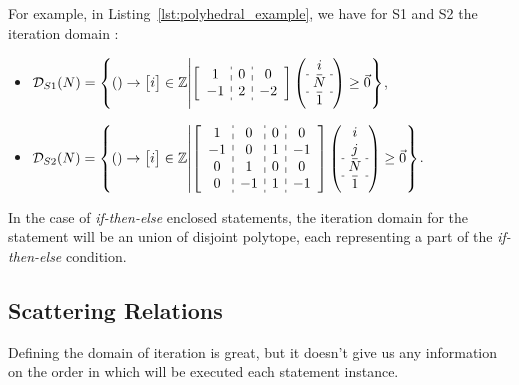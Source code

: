 \documentclass[paper=a4, fontsize=11pt]{scrartcl}
\numberwithin{equation}{section}        %
\numberwithin{figure}{section}          %
\numberwithin{table}{section}               %
\begin{document}
        For example, in Listing~\ref{lst:polyhedral_example}, we have for
        S1 and S2 the iteration domain :
        \begin{itemize}
            \item[]$ \mathcal{D}_{S1}(N) = \left\{() \to \begin{bmatrix}i\end{bmatrix} \in \mathbb{Z} \middle|
            \left[\begin{array}{c:c:c}
                    1 & 0 & 0 \\
                    -1 & 2 & -2
            \end{array}\right]
            \left(\begin{array}{c}
                    i \\ \hdashline
                    N \\ \hdashline
                    1 
            \end{array}\right)
            \geq \vec{0}
            \right\} $,
        
            \item[]$ \mathcal{D}_{S2}(N) = \left\{() \to \begin{bmatrix}i\end{bmatrix} \in \mathbb{Z} \middle|
            \left[\begin{array}{c:c:c:c}
                    1 & 0 & 0 & 0\\
                    -1 & 0 & 1 & -1\\
                    0 & 1 & 0 & 0\\
                    0 & -1 & 1 & -1
            \end{array}\right]
            \left(\begin{array}{c}
                    i \\
                    j \\ \hdashline
                    N \\ \hdashline
                    1 
            \end{array}\right)
            \geq \vec{0}
            \right\} $.
        \end{itemize}

        In the case of \textit{if-then-else} enclosed statements, the iteration domain
        for the statement will be an union of disjoint polytope, each representing a part
        of the \textit{if-then-else} condition.

    \subsection{Scattering Relations}
        Defining the domain of iteration is great, but it doesn't give us any information
        on the order in which will be executed each statement instance.
\end{document}
